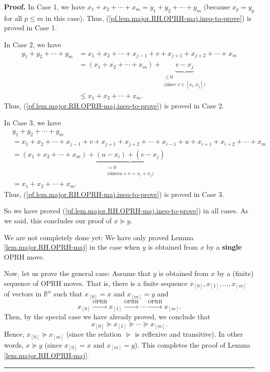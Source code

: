 \documentclass[numbers=enddot,12pt,final,onecolumn,notitlepage]{scrartcl}%
\numberwithin{exer}{subsection}
\theoremstyle{definition}
\newenvironment{proof}[1][Proof]{\noindent\textbf{#1.} }{\ \rule{0.5em}{0.5em}}
\begin{document}
\begin{proof}
In Case 1, we have $x_{1}+x_{2}+\cdots+x_{m}=y_{1}+y_{2}+\cdots+y_{m}$
(because $x_{p}=y_{p}$ for all $p\leq m$ in this case). Thus,
(\ref{pf.lem.major.RH.OPRH-maj.ineq-to-prove}) is proved in Case 1.

In Case 2, we have%
\begin{align*}
y_{1}+y_{2}+\cdots+y_{m}  &  =x_{1}+x_{2}+\cdots+x_{j-1}+v+x_{j+1}%
+x_{j+2}+\cdots+x_{m}\\
&  =\left(  x_{1}+x_{2}+\cdots+x_{m}\right)  +\underbrace{v-x_{j}%
}_{\substack{\leq0\\\text{(since }v\in\left[  x_{i},x_{j}\right]  \text{)}}}\\
&  \leq x_{1}+x_{2}+\cdots+x_{m}.
\end{align*}
Thus, (\ref{pf.lem.major.RH.OPRH-maj.ineq-to-prove}) is proved in Case 2.

In Case 3, we have%
\begin{align*}
&  y_{1}+y_{2}+\cdots+y_{m}\\
&  =x_{1}+x_{2}+\cdots+x_{j-1}+v+x_{j+1}+x_{j+2}+\cdots+x_{i-1}+u+x_{i+1}%
+x_{i+2}+\cdots+x_{m}\\
&  =\left(  x_{1}+x_{2}+\cdots+x_{m}\right)  +\underbrace{\left(
u-x_{i}\right)  +\left(  v-x_{j}\right)  }_{\substack{=0\\\text{(since
}u+v=x_{i}+x_{j}\text{)}}}\\
&  =x_{1}+x_{2}+\cdots+x_{m}.
\end{align*}
Thus, (\ref{pf.lem.major.RH.OPRH-maj.ineq-to-prove}) is proved in Case 3.

So we have proved (\ref{pf.lem.major.RH.OPRH-maj.ineq-to-prove}) in all cases.
As we said, this concludes our proof of $x\succcurlyeq y$.

We are not completely done yet: We have only proved Lemma
\ref{lem.major.RH.OPRH-maj} in the case when $y$ is obtained from $x$ by a
\textbf{single} OPRH move.

Now, let us prove the general case: Assume that $y$ is obtained from $x$ by a
(finite) sequence of OPRH moves. That is, there is a finite sequence
$x_{\left[  0\right]  },x_{\left[  1\right]  },\ldots,x_{\left[  m\right]  }$
of vectors in $\mathbb{R}^{n}$ such that $x_{\left[  0\right]  }=x$ and
$x_{\left[  m\right]  }=y$ and%
\[
x_{\left[  0\right]  }\overset{\text{OPRH}}{\longrightarrow}x_{\left[
1\right]  }\overset{\text{OPRH}}{\longrightarrow}\cdots\overset{\text{OPRH}%
}{\longrightarrow}x_{\left[  m\right]  }.
\]
Then, by the special case we have already proved, we conclude that%
\[
x_{\left[  0\right]  }\succcurlyeq x_{\left[  1\right]  }\succcurlyeq
\cdots\succcurlyeq x_{\left[  m\right]  }.
\]
Hence, $x_{\left[  0\right]  }\succcurlyeq x_{\left[  m\right]  }$ (since the
relation $\succcurlyeq$ is reflexive and transitive). In other words,
$x\succcurlyeq y$ (since $x_{\left[  0\right]  }=x$ and $x_{\left[  m\right]
}=y$). This completes the proof of Lemma \ref{lem.major.RH.OPRH-maj}.
\end{proof}
\end{document}
